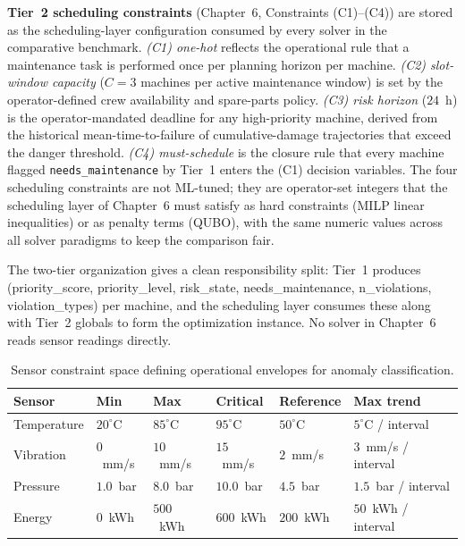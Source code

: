 \textbf{Tier~2 scheduling constraints} (Chapter~6, Constraints (C1)--(C4)) are stored as the scheduling-layer configuration consumed by every solver in the comparative benchmark. \emph{(C1) one-hot} reflects the operational rule that a maintenance task is performed once per planning horizon per machine. \emph{(C2) slot-window capacity} ($C=3$ machines per active maintenance window) is set by the operator-defined crew availability and spare-parts policy. \emph{(C3) risk horizon} ($24$~h) is the operator-mandated deadline for any high-priority machine, derived from the historical mean-time-to-failure of cumulative-damage trajectories that exceed the danger threshold. \emph{(C4) must-schedule} is the closure rule that every machine flagged \texttt{needs\_maintenance} by Tier~1 enters the (C1) decision variables. The four scheduling constraints are not ML-tuned; they are operator-set integers that the scheduling layer of Chapter~6 must satisfy as hard constraints (MILP linear inequalities) or as penalty terms (QUBO), with the same numeric values across all solver paradigms to keep the comparison fair.

The two-tier organization gives a clean responsibility split: Tier~1 produces (priority\_score, priority\_level, risk\_state, needs\_maintenance, n\_violations, violation\_types) per machine, and the scheduling layer consumes these along with Tier~2 globals to form the optimization instance. No solver in Chapter~6 reads sensor readings directly.
\begin{table}[!htbp]
\centering
\caption{Sensor constraint space defining operational envelopes for anomaly classification.}
\label{tab:sens_con}
\small
\renewcommand{\arraystretch}{1.05}
\setlength{\tabcolsep}{4pt}
\begin{tabularx}{\textwidth}{
>{\raggedright\arraybackslash}m{2.6cm}
>{\centering\arraybackslash}m{1.6cm}
>{\centering\arraybackslash}m{1.6cm}
>{\centering\arraybackslash}m{1.8cm}
>{\centering\arraybackslash}m{1.8cm}
>{\raggedright\arraybackslash}X
}
\toprule
\textbf{Sensor} & \textbf{Min} & \textbf{Max} & \textbf{Critical} & \textbf{Reference} & \textbf{Max trend} \\
\midrule
Temperature & $20^\circ$C & $85^\circ$C & $95^\circ$C & $50^\circ$C & $5^\circ$C / interval \\
Vibration   & $0$~mm/s    & $10$~mm/s   & $15$~mm/s   & $2$~mm/s    & $3$~mm/s / interval \\
Pressure    & $1.0$~bar   & $8.0$~bar   & $10.0$~bar  & $4.5$~bar   & $1.5$~bar / interval \\
Energy      & $0$~kWh     & $500$~kWh   & $600$~kWh   & $200$~kWh   & $50$~kWh / interval \\
\bottomrule
\end{tabularx}
\end{table}
\FloatBarrier



